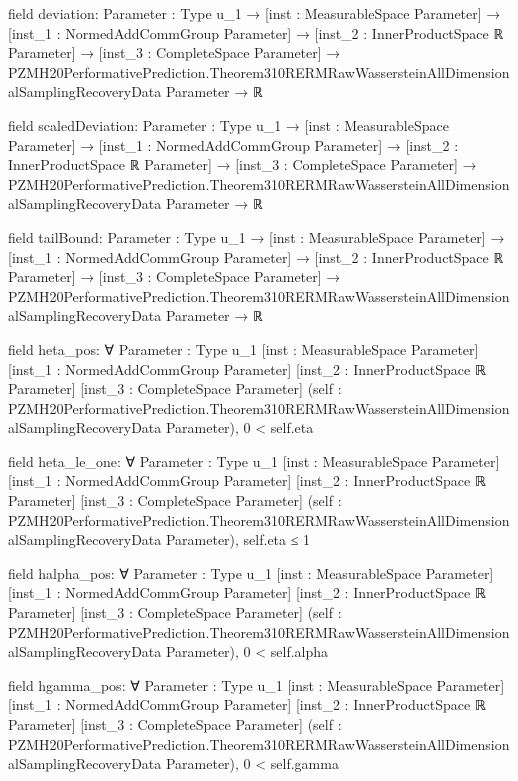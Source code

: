 \documentclass[10pt]{article}
\begin{document}
\begin{ReviewVerbatim}
field deviation:
{Parameter : Type u_1} →
  [inst : MeasurableSpace Parameter] →
    [inst_1 : NormedAddCommGroup Parameter] →
      [inst_2 : InnerProductSpace ℝ Parameter] →
        [inst_3 : CompleteSpace Parameter] →
          PZMH20PerformativePrediction.Theorem310RERMRawWassersteinAllDimensionalSamplingRecoveryData Parameter → ℝ

field scaledDeviation:
{Parameter : Type u_1} →
  [inst : MeasurableSpace Parameter] →
    [inst_1 : NormedAddCommGroup Parameter] →
      [inst_2 : InnerProductSpace ℝ Parameter] →
        [inst_3 : CompleteSpace Parameter] →
          PZMH20PerformativePrediction.Theorem310RERMRawWassersteinAllDimensionalSamplingRecoveryData Parameter → ℝ

field tailBound:
{Parameter : Type u_1} →
  [inst : MeasurableSpace Parameter] →
    [inst_1 : NormedAddCommGroup Parameter] →
      [inst_2 : InnerProductSpace ℝ Parameter] →
        [inst_3 : CompleteSpace Parameter] →
          PZMH20PerformativePrediction.Theorem310RERMRawWassersteinAllDimensionalSamplingRecoveryData Parameter → ℝ

field heta_pos:
∀ {Parameter : Type u_1} [inst : MeasurableSpace Parameter] [inst_1 : NormedAddCommGroup Parameter]
  [inst_2 : InnerProductSpace ℝ Parameter] [inst_3 : CompleteSpace Parameter]
  (self : PZMH20PerformativePrediction.Theorem310RERMRawWassersteinAllDimensionalSamplingRecoveryData Parameter),
  0 < self.eta

field heta_le_one:
∀ {Parameter : Type u_1} [inst : MeasurableSpace Parameter] [inst_1 : NormedAddCommGroup Parameter]
  [inst_2 : InnerProductSpace ℝ Parameter] [inst_3 : CompleteSpace Parameter]
  (self : PZMH20PerformativePrediction.Theorem310RERMRawWassersteinAllDimensionalSamplingRecoveryData Parameter),
  self.eta ≤ 1

field halpha_pos:
∀ {Parameter : Type u_1} [inst : MeasurableSpace Parameter] [inst_1 : NormedAddCommGroup Parameter]
  [inst_2 : InnerProductSpace ℝ Parameter] [inst_3 : CompleteSpace Parameter]
  (self : PZMH20PerformativePrediction.Theorem310RERMRawWassersteinAllDimensionalSamplingRecoveryData Parameter),
  0 < self.alpha

field hgamma_pos:
∀ {Parameter : Type u_1} [inst : MeasurableSpace Parameter] [inst_1 : NormedAddCommGroup Parameter]
  [inst_2 : InnerProductSpace ℝ Parameter] [inst_3 : CompleteSpace Parameter]
  (self : PZMH20PerformativePrediction.Theorem310RERMRawWassersteinAllDimensionalSamplingRecoveryData Parameter),
  0 < self.gamma


\end{ReviewVerbatim}
\end{document}
